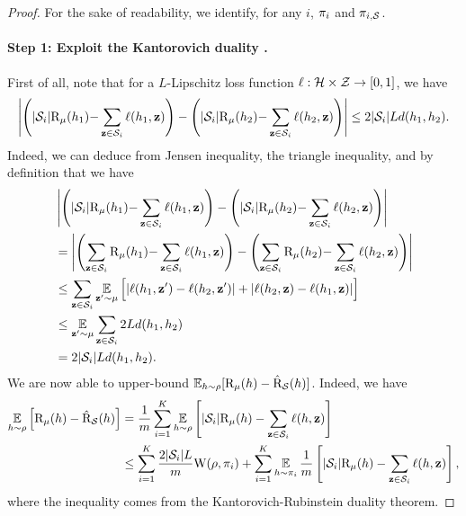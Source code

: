 \documentclass{article}
\begin{document}
\theoremsupervisednnl*
\begin{proof}
For the sake of readability, we identify, for any $i$, $\P_i $ and $\P_{i,\S}$.
\paragraph{Step 1: Exploit the Kantorovich duality \cite[Remark 6.5]{villani2009optimal}.}
First of all, note that for a $L$-Lipschitz loss function $\loss: \H\times\Z\to[0,1]$, we have
\begin{align}
\LN\LP |\S_i|\Risk_{\D}(h_1){-}\sum_{\z\in\S_i}\loss(h_1, \z)\RP - \LP |\S_i|\Risk_{\D}(h_2){-}\sum_{\z\in\S_i}\loss(h_2, \z)\RP\RN \le 2|\S_i|Ld(h_1, h_2).\label{eq:proof-supervised-1}
\end{align}
Indeed, we can deduce  from Jensen inequality, the triangle inequality, and by definition that we have
\begin{align*}
&\LN\LP |\S_i|\Risk_{\D}(h_1){-}\sum_{\z\in\S_i}\loss(h_1, \z)\RP - \LP |\S_i|\Risk_{\D}(h_2){-}\sum_{\z\in\S_i}\loss(h_2, \z)\RP\RN\\
&= \LN\LP\sum_{\z\in\S_i}\Risk_{\D}(h_1){-}\sum_{\z\in\S_i}\loss(h_1, \z)\RP - \LP\sum_{\z\in\S_i}\Risk_{\D}(h_2){-}\sum_{\z\in\S_i}\loss(h_2, \z)\RP\RN\\
&\le \sum_{\z\in\S_i}\EE_{\z'\sim\D}\Big[ |\loss(h_1, \z')-\loss(h_2, \z')|+|\loss(h_2, \z)-\loss(h_1, \z)|\Big]\\
&\le \EE_{\z'\sim\D}\sum_{\z\in\S_i} 2Ld(h_1, h_2)\\
&= 2|\S_i|Ld(h_1, h_2).
\end{align*}
We are now able to upper-bound $\EE_{h\sim\Q}[ \Risk_{\D}(h) - \Riskhat_{\S}(h) ]$. 
Indeed, we have
\begin{align}
\EE_{h\sim\Q}\Big[ \Risk_{\D}(h) - \Riskhat_{\S}(h) \Big] &= \frac{1}{m}\sum_{i=1}^{K} \EE_{h\sim\Q}\LB |\S_i|\Risk_{\D}(h) - \sum_{\z\in\S_i}\loss(h, \z) \RB\nonumber\\
&\le \sum_{i=1}^{K} \frac{2|\S_i|L}{m}\W(\Q, \P_i) + \sum_{i=1}^{K} \EE_{h\sim\P_i} \frac{1}{m}\LB |\S_i|\Risk_{\D}(h) - \sum_{\z\in\S_i} \loss(h, \z) \RB,\label{eq:proof-supervised-2}
\end{align}
where the inequality comes from the Kantorovich-Rubinstein duality theorem.


\end{proof}
\end{document}
